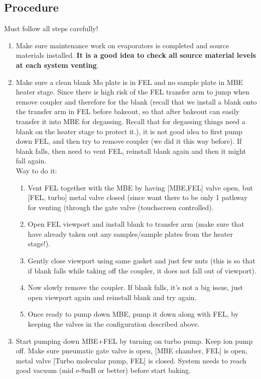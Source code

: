 \subsection{Procedure}
Must follow all steps carefully!
\begin{enumerate}
\item Make sure maintenance work on evaporators is completed and source materials installed. \textbf{It is a good idea to check all source material levels at each system venting}. 
\item Make sure a clean blank Mo plate is in FEL and no sample plate in MBE heater stage. Since there is high risk of the FEL transfer arm to jump when remove coupler and therefore for the blank (recall that we install a blank onto the transfer arm in FEL before bakeout, so that after bakeout can easily transfer it into MBE for degassing. Recall that for degassing things need a blank on the heater stage to protect it.), it is not good idea to first pump down FEL, and then try to remove coupler (we did it this way before). If blank falls, then need to vent FEL, reinstall blank again and then it might fall again.\\
Way to do it:
\begin{enumerate}
	\item	Vent FEL together with the MBE by having [MBE,FEL] valve open, but [FEL, turbo] metal valve closed (since want there to be only 1 pathway for venting (through the gate valve (touchscreen controlled).  
	\item	Open FEL viewport and install blank to transfer arm (make sure that have already taken out any samples/sample plates from the heater stage!). 
	\item	Gently close viewport using same gasket and just few nuts (this is so that if blank falls while taking off the coupler, it does not fall out of viewport). 
	\item	Now slowly remove the coupler. If blank falls, it’s not a big issue, just open viewport again and reinstall blank and try again.
	\item	Once ready to pump down MBE, pump it down along with FEL, by keeping the valves in the configuration described above.
\end{enumerate}
\item	Start pumping down MBE+FEL by turning on turbo pump. Keep ion pump off. Make sure pneumatic gate valve is open, [MBE chamber, FEL] is open, metal valve [Turbo molecular pump, FEL] is closed. System needs to reach good vacuum (mid e-8mB or better) before start baking. 

\end{enumerate}
